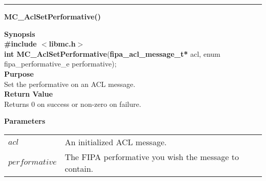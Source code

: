\noindent
\vspace{5pt}
\rule{6.5in}{0.015in}
\noindent
{}
{\LARGE \bf MC\_AclSetPerformative()}\\
\label{api:MC_Acl_SetPerformative()}

\noindent
{\bf Synopsis}\\
{\bf \#include $<$libmc.h$>$}\\
{\bf int MC\_AclSetPerformative}({\bf fipa\_acl\_message\_t*} acl, enum fipa\_performative\_e performative);\\

\noindent
{\bf Purpose}\\
Set the performative on an ACL message.\\

\noindent
{\bf Return Value}\\
Returns 0 on success or non-zero on failure.

\noindent
{\bf Parameters}
\vspace{-0.1in}
\begin{description}
\item
\begin{tabular}{p{20 mm}p{145 mm}} 
$acl$ & An initialized ACL message. \\
$performative$ & The FIPA performative you wish the message to contain.
\end{tabular}
\end{description}

